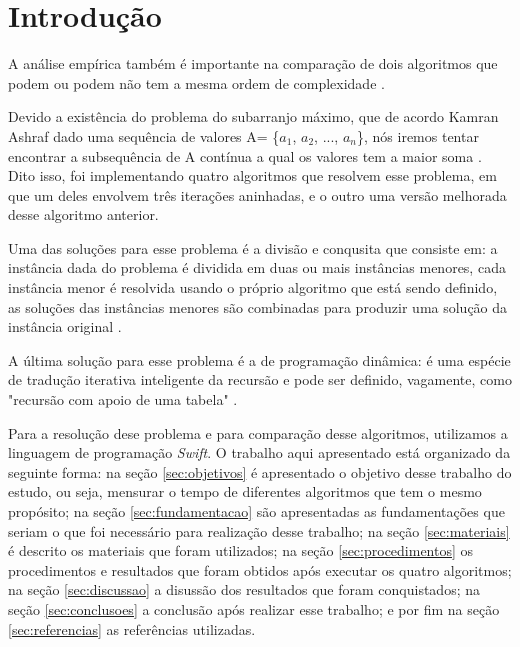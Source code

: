 \documentclass[
	12pt,				%
	oneside,   	        %
	a4paper,			%
	english,			%
	french,				%
	spanish,			%
	brazil,				%
	]{pacotes/abntex2}
\begin{document}
\tableofcontents*
\cleardoublepage

\textual

\makeatletter
\renewcommand{\chapter}{\@gobbletwo}
\makeatother

\section{Introdução}
\label{sec:introducao}
A análise empírica também é importante na comparação de dois algoritmos que podem ou podem não tem a mesma ordem de complexidade \cite{Sanders:2002}.

Devido a existência do problema do subarranjo máximo, que de acordo Kamran Ashraf dado uma sequência de valores A= \{$a_1$, $a_2$, ..., $a_n$\}, nós iremos tentar encontrar a subsequência de A contínua a qual os valores tem a maior soma \cite{Ashraf:2015}. Dito isso, foi implementando quatro algoritmos que resolvem esse problema, em que um deles envolvem três iterações aninhadas, e o outro uma versão melhorada desse algoritmo anterior.

Uma das soluções para esse problema é a divisão e conqusita que consiste em: a instância dada do problema é dividida em duas ou mais instâncias menores, cada instância menor é resolvida usando o próprio algoritmo que está sendo definido, as soluções das instâncias menores são combinadas para produzir uma solução da instância original \cite{DC:Feofiloff:2013}.

A última solução para esse problema é a de programação dinâmica: é uma espécie de tradução iterativa inteligente da recursão e pode ser definido, vagamente, como "recursão com apoio de uma tabela" \cite{PD:Feofiloff:2013}.

Para a resolução dese problema e para comparação desse algoritmos, utilizamos a linguagem de programação \textit{Swift}. O trabalho aqui apresentado está organizado da seguinte forma: na seção \ref{sec:objetivos} é apresentado o objetivo desse trabalho do estudo, ou seja, mensurar o tempo de diferentes algoritmos que tem o mesmo propósito; na seção \ref{sec:fundamentacao} são apresentadas as fundamentações que seriam o que foi necessário para realização desse trabalho; na seção \ref{sec:materiais} é descrito os materiais que foram utilizados; na seção \ref{sec:procedimentos} os procedimentos e resultados que foram obtidos após executar os quatro algoritmos; na seção \ref{sec:discussao} a disussão dos resultados que foram conquistados; na seção \ref{sec:conclusoes} a conclusão após realizar esse trabalho; e por fim na seção \ref{sec:referencias} as referências utilizadas.
\end{document}
